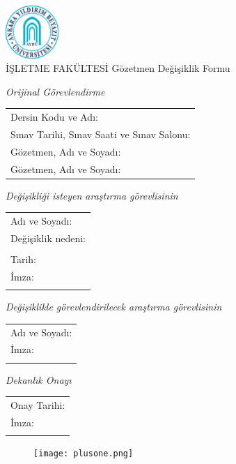 \documentclass[12pt,a4paper]{article}
\begin{document}
\setlength\parindent{0cm}
\begin{center}
{\includegraphics[height=2cm]{ybu-logo.pdf}\\İŞLETME FAKÜLTESİ}
\vskip0.4cm
Gözetmen Değişiklik Formu
\end{center}

%
\emph{Orijinal Görevlendirme}
\vskip0.2cm  
\renewcommand{\arraystretch}{1.5}
\begin{tabular}{|p{17cm}|}
\hline
  Dersin Kodu ve Adı: \\
  Sınav Tarihi, Sınav Saati ve Sınav Salonu: \\
  Gözetmen, Adı ve Soyadı: \\ 
  Gözetmen, Adı ve Soyadı: \\ \hline
\end{tabular}
\renewcommand{\arraystretch}{1}
\vskip0.2cm
\emph{Değişikliği isteyen araştırma görevlisinin}
\vskip0.2cm    
\renewcommand{\arraystretch}{1.5}
\begin{tabular}{|p{17cm}|}
\hline
  Adı ve Soyadı: \\
  Değişiklik nedeni: \\
  \\
  Tarih: \\
  İmza: \\
  \\
\hline
\end{tabular}
\renewcommand{\arraystretch}{1}
\vskip0.2cm
\emph{Değişiklikle görevlendirilecek araştırma görevlisinin}
\vskip0.2cm    
\renewcommand{\arraystretch}{1.5}
\begin{tabular}{|p{17cm}|}
\hline
  Adı ve Soyadı: \\
  İmza: \\
  \\
\hline
\end{tabular}
\renewcommand{\arraystretch}{1}
\vskip0.2cm
\emph{Dekanlık Onayı}
\vskip0.2cm    
\renewcommand{\arraystretch}{1.5}
\begin{tabular}{|p{17cm}|}
\hline
  Onay Tarihi: \\
  İmza: \\
  \\
\hline
\end{tabular}
\renewcommand{\arraystretch}{1}
\vskip1cm
\begin{figure}[b]
{\texttt{[image: plusone.png]}}
\end{figure}
\end{document}
